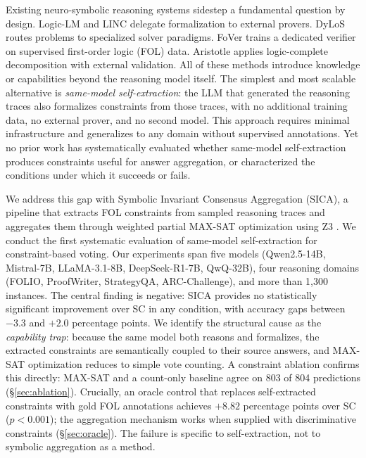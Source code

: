 Existing neuro-symbolic reasoning systems sidestep a fundamental question by design. Logic-LM \citep{pan2023logiclm} and LINC \citep{olausson2023linc} delegate formalization to external provers. DyLoS \citep{xu2026dylos} routes problems to specialized solver paradigms. FoVer \citep{wang2025fover} trains a dedicated verifier on supervised first-order logic (FOL) data. Aristotle \citep{li2025aristotle} applies logic-complete decomposition with external validation. All of these methods introduce knowledge or capabilities beyond the reasoning model itself. The simplest and most scalable alternative is \emph{same-model self-extraction}: the LLM that generated the reasoning traces also formalizes constraints from those traces, with no additional training data, no external prover, and no second model. This approach requires minimal infrastructure and generalizes to any domain without supervised annotations. Yet no prior work has systematically evaluated whether same-model self-extraction produces constraints useful for answer aggregation, or characterized the conditions under which it succeeds or fails.

We address this gap with Symbolic Invariant Consensus Aggregation (SICA), a pipeline that extracts FOL constraints from sampled reasoning traces and aggregates them through weighted partial MAX-SAT optimization using Z3 \citep{demoura2008z3}. We conduct the first systematic evaluation of same-model self-extraction for constraint-based voting. Our experiments span five models (Qwen2.5-14B, Mistral-7B, LLaMA-3.1-8B, DeepSeek-R1-7B, QwQ-32B), four reasoning domains (FOLIO, ProofWriter, StrategyQA, ARC-Challenge), and more than 1,300 instances. The central finding is negative: SICA provides no statistically significant improvement over SC in any condition, with accuracy gaps between $-3.3$ and $+2.0$ percentage points. We identify the structural cause as the \emph{capability trap}: because the same model both reasons and formalizes, the extracted constraints are semantically coupled to their source answers, and MAX-SAT optimization reduces to simple vote counting. A constraint ablation confirms this directly: MAX-SAT and a count-only baseline agree on 803 of 804 predictions (\S\ref{sec:ablation}). Crucially, an oracle control that replaces self-extracted constraints with gold FOL annotations achieves $+8.82$ percentage points over SC ($p < 0.001$); the aggregation mechanism works when supplied with discriminative constraints (\S\ref{sec:oracle}). The failure is specific to self-extraction, not to symbolic aggregation as a method.

